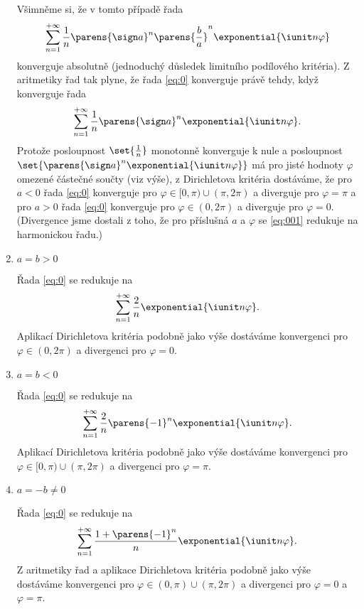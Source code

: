 \documentclass[answers]{exam}
\begin{document}
\begin{questions}
\begin{solution}
\begin{enumerate}[label=(\roman*)]
	  	Všimněme si, že v tomto případě řada
	  	\begin{equation*}
	  		\sum_{n=1}^{+\infty}
	  		\frac{1}{n} \parens{\sign a}^n \parens{\frac{b}{a}}^n \exponential{\iunit n \varphi}
	  	\end{equation*}
	  	konverguje absolutně (jednoduchý důsledek limitního podílového kritéria). Z aritmetiky řad tak plyne, že řada \eqref{eq:0} konverguje právě tehdy, když konverguje řada
	  	\begin{equation}
	  		\label{eq:001}
	  		\sum_{n=1}^{+\infty}
	  		\frac{1}{n} \parens{\sign a}^n \exponential{\iunit n \varphi}.
	  	\end{equation}
	  	Protože posloupnost $\set{\frac{1}{n}}$ monotonně konverguje k nule a posloupnost $\set{\parens{\sign a}^n \exponential{\iunit n \varphi}}$ má pro jisté hodnoty $\varphi$ omezené částečné součty (viz výše), z Dirichletova kritéria dostáváme, že pro $a < 0$ řada \eqref{eq:0} konverguje pro $\varphi \in [0, \pi) \cup (\pi, 2 \pi)$ a diverguje pro $\varphi = \pi$ a pro $a > 0$ řada \eqref{eq:0} konverguje pro $\varphi \in (0, 2\pi)$ a diverguje pro $\varphi = 0$. (Divergence jsme dostali z toho, že pro příslušná $a$ a $\varphi$ se \eqref{eq:001} redukuje na harmonickou řadu.)
	  	
	  	\item $a = b > 0$
  		
  		Řada \eqref{eq:0} se redukuje na
  		\begin{equation*}
		    \sum_{n = 1}^{+\infty}
		    \frac{2}{n}
		    \exponential{\iunit n \varphi}.
  		\end{equation*}
  		Aplikací Dirichletova kritéria podobně jako výše dostáváme konvergenci pro $\varphi \in (0, 2\pi)$ a divergenci pro $\varphi = 0$.
  		
	  	\item $a = b < 0$
  		
  		Řada \eqref{eq:0} se redukuje na
  		\begin{equation*}
		    \sum_{n = 1}^{+\infty}
		    \frac{2}{n} \parens{-1}^n
		    \exponential{\iunit n \varphi}.
  		\end{equation*}
  		Aplikací Dirichletova kritéria podobně jako výše dostáváme konvergenci pro $\varphi \in [0, \pi) \cup (\pi, 2 \pi)$ a divergenci pro $\varphi = \pi$.
  		
	  	\item $a = -b \neq 0$
  		
  		Řada \eqref{eq:0} se redukuje na
  		\begin{equation*}
		    \sum_{n = 1}^{+\infty}
		    \frac{1 + \parens{-1}^n}{n} 
		    \exponential{\iunit n \varphi}.
  		\end{equation*}
  		Z aritmetiky řad a aplikace Dirichletova kritéria podobně jako výše dostáváme konvergenci pro $\varphi \in (0, \pi) \cup (\pi, 2 \pi)$ a divergenci pro $\varphi = 0$ a $\varphi =\pi$.
  	\end{enumerate}
  \end{solution}


\end{questions}
\end{document}
